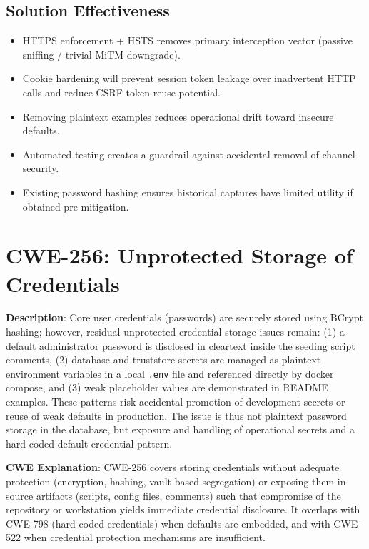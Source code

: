 \documentclass[]{UCD_CS_FYP_Report}
\begin{document}
\subsection*{Solution Effectiveness}
\begin{itemize}
	\item HTTPS enforcement + HSTS removes primary interception vector (passive sniffing / trivial MiTM downgrade).
	\item Cookie hardening will prevent session token leakage over inadvertent HTTP calls and reduce CSRF token reuse potential.
	\item Removing plaintext examples reduces operational drift toward insecure defaults.
	\item Automated testing creates a guardrail against accidental removal of channel security.
	\item Existing password hashing ensures historical captures have limited utility if obtained pre-mitigation.
\end{itemize}


\section{CWE-256: Unprotected Storage of Credentials}

	\textbf{Description}: Core user credentials (passwords) are securely stored using BCrypt hashing; however, residual unprotected credential storage issues remain: (1) a default administrator password is disclosed in cleartext inside the seeding script comments, (2) database and truststore secrets are managed as plaintext environment variables in a local \texttt{.env} file and referenced directly by docker compose, and (3) weak placeholder values are demonstrated in README examples. These patterns risk accidental promotion of development secrets or reuse of weak defaults in production. The issue is thus not plaintext password storage in the database, but exposure and handling of operational secrets and a hard-coded default credential pattern.

	\textbf{CWE Explanation}: CWE-256 covers storing credentials without adequate protection (encryption, hashing, vault-based segregation) or exposing them in source artifacts (scripts, config files, comments) such that compromise of the repository or workstation yields immediate credential disclosure. It overlaps with CWE-798 (hard-coded credentials) when defaults are embedded, and with CWE-522 when credential protection mechanisms are insufficient.
\end{document}

